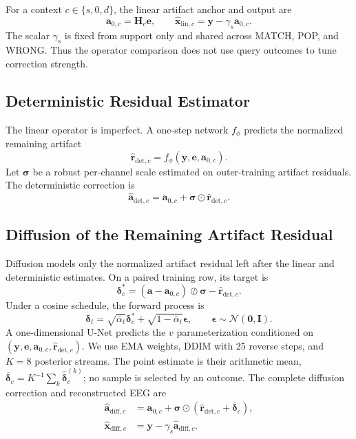 For a context $c\in\{s,0,d\}$, the linear artifact anchor and output are
\begin{equation}
  \mathbf a_{0,c}=\mathbf H_c\mathbf e,
  \qquad
  \widehat{\mathbf x}_{\mathrm{lin},c}
  =\mathbf y-\gamma_s\mathbf a_{0,c}.
  \label{eq:linear_anchor}
\end{equation}
The scalar $\gamma_s$ is fixed from support only and shared across MATCH, POP,
and WRONG. Thus the operator comparison does not use query outcomes to tune
correction strength.

\subsection{Deterministic Residual Estimator}
The linear operator is imperfect. A one-step network $f_\phi$ predicts the
normalized remaining artifact
\begin{equation}
  \widehat{\mathbf r}_{\mathrm{det},c}
  = f_\phi(\mathbf y,\mathbf e,\mathbf a_{0,c}).
  \label{eq:det_residual}
\end{equation}
Let $\boldsymbol\sigma$ be a robust per-channel scale estimated on outer-training
artifact residuals. The deterministic correction is
\begin{equation}
  \widehat{\mathbf a}_{\mathrm{det},c}
  =\mathbf a_{0,c}+\boldsymbol\sigma\odot
  \widehat{\mathbf r}_{\mathrm{det},c}.
\end{equation}

\subsection{Diffusion of the Remaining Artifact Residual}
Diffusion models only the normalized artifact residual left after the linear and
deterministic estimates. On a paired training row, its target is
\begin{equation}
  \boldsymbol\delta_c^*=
  (\mathbf a-\mathbf a_{0,c})\oslash\boldsymbol\sigma
  -\widehat{\mathbf r}_{\mathrm{det},c}.
\end{equation}
Under a cosine schedule, the forward process is
\begin{equation}
  \boldsymbol\delta_t=\sqrt{\bar\alpha_t}\boldsymbol\delta_c^*
  +\sqrt{1-\bar\alpha_t}\boldsymbol\epsilon,
  \qquad \boldsymbol\epsilon\sim\mathcal N(\mathbf0,\mathbf I).
\end{equation}
A one-dimensional U-Net predicts the $v$ parameterization conditioned on
$(\mathbf y,\mathbf e,\mathbf a_{0,c},\widehat{\mathbf r}_{\mathrm{det},c})$.
We use EMA weights, DDIM with 25 reverse steps, and $K=8$ posterior streams.
The point estimate is their arithmetic mean,
$\overline{\boldsymbol\delta}_c=K^{-1}\sum_k
\widehat{\boldsymbol\delta}^{(k)}_c$; no sample is selected by an outcome.
The complete diffusion correction and reconstructed EEG are
\begin{align}
  \widehat{\mathbf a}_{\mathrm{diff},c}
    &=\mathbf a_{0,c}+\boldsymbol\sigma\odot
      (\widehat{\mathbf r}_{\mathrm{det},c}+
       \overline{\boldsymbol\delta}_c),\\
  \widehat{\mathbf x}_{\mathrm{diff},c}
    &=\mathbf y-\gamma_s\widehat{\mathbf a}_{\mathrm{diff},c}.
  \label{eq:reconstruction}
\end{align}

